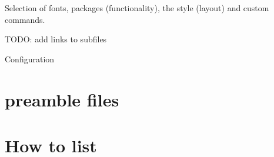Selection of fonts, packages (functionality), the style (layout) and custom commands.

TODO: add links to subfiles

Configuration


% 

\chapter{preamble files}

\chapter{How to list}